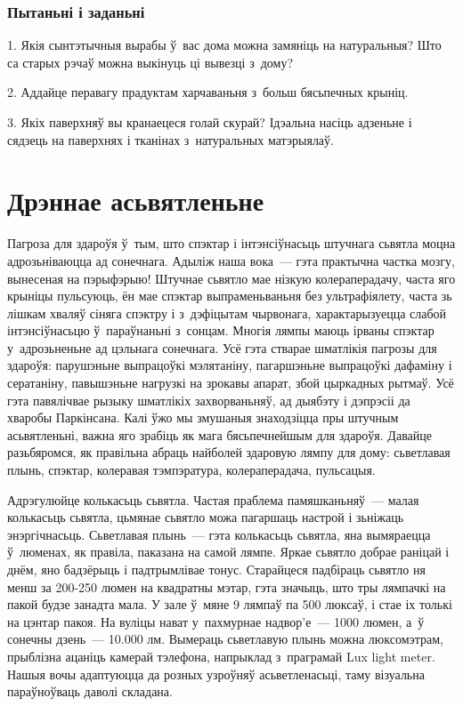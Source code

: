 \subsubsection{Пытаньні і заданьні}

1. Якія сынтэтычныя вырабы ў~вас дома можна замяніць на натуральныя? Што са старых рэчаў можна выкінуць ці вывезці з~дому?

2. Аддайце перавагу прадуктам харчаваньня з~больш бясьпечных крыніц.

3. Якіх паверхняў вы кранаецеся голай скурай? Ідэальна насіць адзеньне і сядзець на паверхнях і тканінах з~натуральных матэрыялаў.


\section{Дрэннае асьвятленьне}

Пагроза для здароўя ў~тым, што спэктар і інтэнсіўнасьць штучнага сьвятла моцна адрозьніваюцца ад сонечнага. Адыліж наша вока~--- гэта практычна частка мозгу, вынесеная на пэрыфэрыю! Штучнае сьвятло мае нізкую колераперадачу, часта яго крыніцы пульсуюць, ён мае спэктар выпраменьваньня без ультрафіялету, часта зь лішкам хваляў сіняга спэктру і з~дэфіцытам чырвонага, характарызуецца слабой інтэнсіўнасьцю ў~параўнаньні з~сонцам. Многія лямпы маюць ірваны спэктар у~адрозьненьне ад цэльнага сонечнага. Усё гэта стварае шматлікія пагрозы для здароўя: парушэньне выпрацоўкі мэлятаніну, пагаршэньне выпрацоўкі дафаміну і сератаніну, павышэньне нагрузкі на зрокавы апарат, збой цыркадных рытмаў. Усё гэта павялічвае рызыку шматлікіх захворваньняў, ад дыябэту і дэпрэсіі да хваробы Паркінсана. Калі ўжо мы змушаныя знаходзіцца пры штучным асьвятленьні, важна яго зрабіць як мага бясьпечнейшым для здароўя. Давайце разьбяромся, як правільна абраць найболей здаровую лямпу для дому: сьветлавая плынь, спэктар, колеравая тэмпэратура, колераперадача, пульсацыя.

Адрэгулюйце колькасьць сьвятла. Частая праблема памяшканьняў~--- малая колькасьць сьвятла, цьмянае сьвятло можа пагаршаць настрой і зьніжаць энэргічнасьць. Сьветлавая плынь~--- гэта колькасьць сьвятла, яна вымяраецца ў~люменах, як правіла, паказана на самой лямпе. Яркае сьвятло добрае раніцай і днём, яно бадзёрыць і падтрымлівае тонус. Старайцеся падбіраць сьвятло ня менш за 200-250 люмен на квадратны мэтар, гэта значыць, што тры лямпачкі на пакой будзе занадта мала. У зале ў~мяне 9 лямпаў па 500 люксаў, і стае іх толькі на цэнтар пакоя. На вуліцы нават у~пахмурнае надвор'е~--- 1000 люмен, а~ў сонечны дзень~--- 10.000 лм. Вымераць сьветлавую плынь можна люксомэтрам, прыблізна ацаніць камерай тэлефона, напрыклад з~праграмай Lux light meter. Нашыя вочы адаптуюцца да розных узроўняў асьветленасьці, таму візуальна параўноўваць даволі складана.

